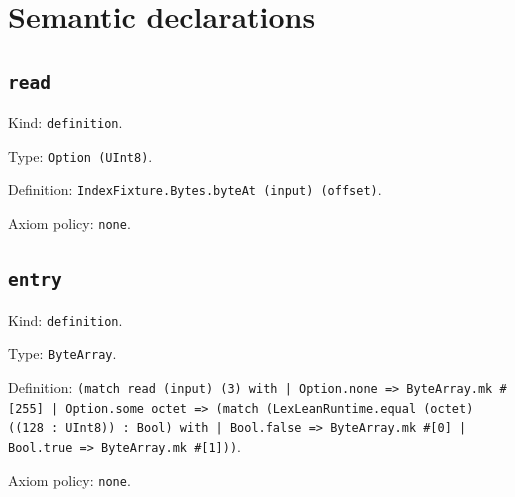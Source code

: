 \documentclass[11pt]{article}
\begin{document}
\section*{Semantic declarations}
\subsection*{\texttt{read}}
\noindent Kind: \texttt{definition}.\par
\noindent Type: \texttt{Option (UInt8)}.\par
\noindent Definition: \texttt{IndexFixture.Bytes.byteAt (input) (offset)}.\par
\noindent Axiom policy: \texttt{none}.\par
\subsection*{\texttt{entry}}
\noindent Kind: \texttt{definition}.\par
\noindent Type: \texttt{ByteArray}.\par
\noindent Definition: \texttt{(match read (input) (3) with | Option.none => ByteArray.mk \#[255] | Option.some octet => (match (LexLeanRuntime.equal (octet) ((128 : UInt8)) : Bool) with | Bool.false => ByteArray.mk \#[0] | Bool.true => ByteArray.mk \#[1]))}.\par
\noindent Axiom policy: \texttt{none}.\par
\end{document}
